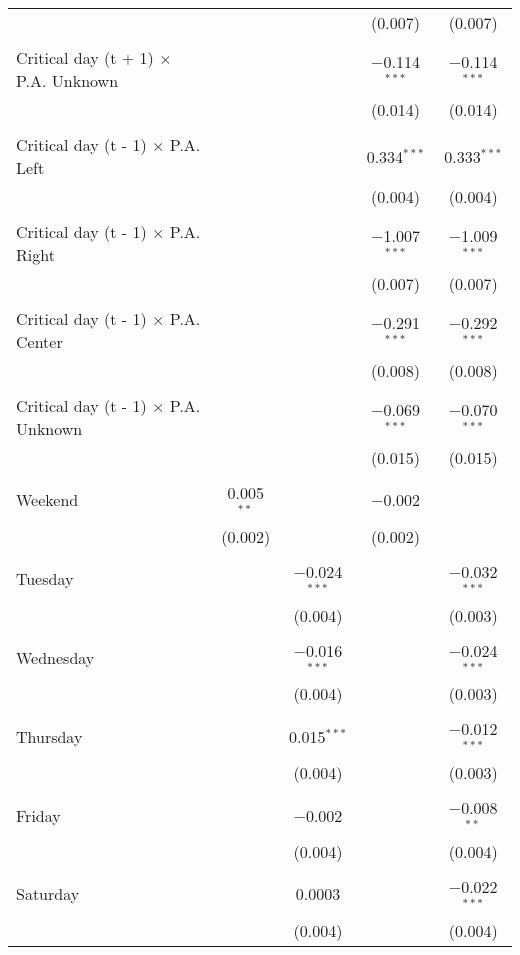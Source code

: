 \documentclass[
]{article}
\begin{document}
\begin{table}[!htbp]
{\begin{tabular}{@{\extracolsep{5pt}}lcccc}
  &  &  & (0.007) & (0.007) \\ 
  & & & & \\ 
 Critical day (t + 1) $\times$ P.A. Unknown &  &  & $-$0.114$^{***}$ & $-$0.114$^{***}$ \\ 
  &  &  & (0.014) & (0.014) \\ 
  & & & & \\ 
 Critical day (t - 1) $\times$ P.A. Left &  &  & 0.334$^{***}$ & 0.333$^{***}$ \\ 
  &  &  & (0.004) & (0.004) \\ 
  & & & & \\ 
 Critical day (t - 1) $\times$ P.A. Right &  &  & $-$1.007$^{***}$ & $-$1.009$^{***}$ \\ 
  &  &  & (0.007) & (0.007) \\ 
  & & & & \\ 
 Critical day (t - 1) $\times$ P.A. Center &  &  & $-$0.291$^{***}$ & $-$0.292$^{***}$ \\ 
  &  &  & (0.008) & (0.008) \\ 
  & & & & \\ 
 Critical day (t - 1) $\times$ P.A. Unknown &  &  & $-$0.069$^{***}$ & $-$0.070$^{***}$ \\ 
  &  &  & (0.015) & (0.015) \\ 
  & & & & \\ 
 Weekend & 0.005$^{**}$ &  & $-$0.002 &  \\ 
  & (0.002) &  & (0.002) &  \\ 
  & & & & \\ 
 Tuesday &  & $-$0.024$^{***}$ &  & $-$0.032$^{***}$ \\ 
  &  & (0.004) &  & (0.003) \\ 
  & & & & \\ 
 Wednesday &  & $-$0.016$^{***}$ &  & $-$0.024$^{***}$ \\ 
  &  & (0.004) &  & (0.003) \\ 
  & & & & \\ 
 Thursday &  & 0.015$^{***}$ &  & $-$0.012$^{***}$ \\ 
  &  & (0.004) &  & (0.003) \\ 
  & & & & \\ 
 Friday &  & $-$0.002 &  & $-$0.008$^{**}$ \\ 
  &  & (0.004) &  & (0.004) \\ 
  & & & & \\ 
 Saturday &  & 0.0003 &  & $-$0.022$^{***}$ \\ 
  &  & (0.004) &  & (0.004) \\ 

\end{tabular}}
\end{table}
\end{document}
